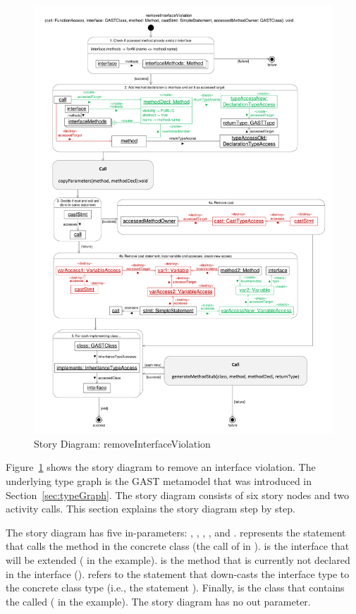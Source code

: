 \begin{figure}[hbtp]
\centering
\includegraphics[width=\linewidth]{./figures/SDRemoveInterfaceViolation}
\caption{Story Diagram: removeInterfaceViolation}
\label{fig:SDRemoveInterfaceViolation}
\end{figure}

Figure~\ref{fig:SDRemoveInterfaceViolation} shows the story diagram to remove an interface violation. The underlying type graph is the GAST metamodel that was introduced in Section~\ref{sec:typeGraph}. The story diagram consists of six story nodes and two activity calls. This section explains the story diagram step by step.

The story diagram has five in-parameters: , , , , and .  represents the statement that calls the method in the concrete class (the call of  in ).  is the interface that will be extended ( in the example).  is the method that is currently not declared in the interface ().  refers to the statement that down-casts the interface type to the concrete class type (i.e., the statement ). Finally,  is the class that contains the called  ( in the example). The story diagram has no out parameter.

